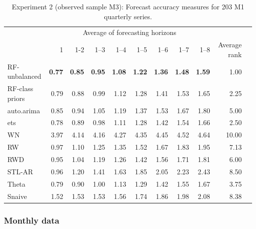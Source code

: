 \documentclass[11pt,a4paper,]{article}
\theoremstyle{definition}
\theoremstyle{definition}
\theoremstyle{definition}
\theoremstyle{remark}
\begin{document}
\begin{table}[!h]
\centering\small
\caption{Experiment 2 (observed sample M3): Forecast accuracy measures for 203 M1 quarterly series.}
\label{M1Q}
\begin{tabular}{lrrrrrrrrrl}
\toprule
 & \multicolumn{8}{c}{Average of forecasting horizons}    &  \\ 
                & 1         & 1-2       & 1--3      & 1--4      & 1--5      & 1--6      & 1--7      & 1--8      & Average rank  \\
\midrule
RF-unbalanced   & \bf{0.77} & \bf{0.85} & \bf{0.95} & \bf{1.08} & \bf{1.22} & \bf{1.36} & \bf{1.48} & \bf{1.59} & 1.00  \\
RF-class priors & 0.79      & 0.88      & 0.99      & 1.12      & 1.28      & 1.41      & 1.53      & 1.65      & 2.25    \\
auto.arima      & 0.85      & 0.94      & 1.05      & 1.19      & 1.37      & 1.53      & 1.67      & 1.80      & 5.00  \\
ets             & 0.78      & 0.89      & 0.98      & 1.11      & 1.28      & 1.42      & 1.54      & 1.66      & 2.50  \\
WN              & 3.97      & 4.14      & 4.16      & 4.27      & 4.35      & 4.45      & 4.52      & 4.64      & 10.00   \\
RW              & 0.97      & 1.10      & 1.25      & 1.35      & 1.52      & 1.67      & 1.83      & 1.95      & 7.13  \\
RWD             & 0.95      & 1.04      & 1.19      & 1.26      & 1.42      & 1.56      & 1.71      & 1.81      & 6.00  \\
STL-AR          & 0.96      & 1.20      & 1.41      & 1.63      & 1.85      & 2.05      & 2.23      & 2.43      & 8.50   \\
Theta           & 0.79      & 0.90      & 1.00      & 1.13      & 1.29      & 1.42      & 1.55      & 1.67      & 3.75 \\
Snaive          & 1.52      & 1.53      & 1.53      & 1.56      & 1.74      & 1.86      & 1.98      & 2.08      & 8.38   \\
\bottomrule
\end{tabular}
\end{table}

\subsubsection*{Monthly data}\label{monthly-data}
\end{document}
